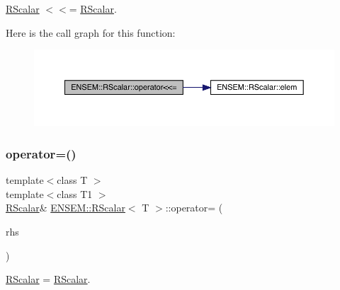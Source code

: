 \mbox{\hyperlink{classENSEM_1_1RScalar}{R\+Scalar}} $<$$<$= \mbox{\hyperlink{classENSEM_1_1RScalar}{R\+Scalar}}. 

Here is the call graph for this function\+:
\nopagebreak
\begin{figure}[H]
\begin{center}
\leavevmode
\includegraphics[width=350pt]{d0/d8c/classENSEM_1_1RScalar_a4f12bedac2ac4848354e3c3018f6c9aa_cgraph}
\end{center}
\end{figure}
\mbox{\label{classENSEM_1_1RScalar_a81b105339878a490866e9467135ae4fa}} 
\subsubsection{\texorpdfstring{operator=()}{operator=()}\hspace{0.1cm}{\footnotesize\ttfamily [1/3]}}
{\footnotesize\ttfamily template$<$class T $>$ \\
template$<$class T1 $>$ \\
\mbox{\hyperlink{classENSEM_1_1RScalar}{R\+Scalar}}\& \mbox{\hyperlink{classENSEM_1_1RScalar}{E\+N\+S\+E\+M\+::\+R\+Scalar}}$<$ T $>$\+::operator= (\begin{DoxyParamCaption}\item[{const \mbox{\hyperlink{classENSEM_1_1RScalar}{R\+Scalar}}$<$ T1 $>$ \&}]{rhs }\end{DoxyParamCaption})\hspace{0.3cm}{\ttfamily [inline]}}



\mbox{\hyperlink{classENSEM_1_1RScalar}{R\+Scalar}} = \mbox{\hyperlink{classENSEM_1_1RScalar}{R\+Scalar}}. 

